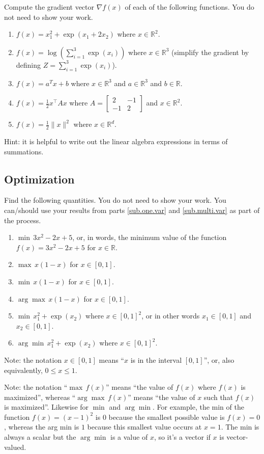 \documentclass{article}
\def\blu#1{{\color{blu}#1}}
\def\norm#1{\|#1\|}
\def\R{\mathbb{R}}
\def\half{\frac 1 2}
\begin{document}
\blu{Compute the gradient vector $\nabla f(x)$ of each of the following functions.} You do not need to show your work.
\begin{enumerate}
\item $f(x) = x_1^2 + \exp(x_1 + 2x_2)$ where $x \in \R^2$.
\item $f(x) = \log\left(\sum_{i=1}^3\exp(x_i)\right)$ where $x \in \R^3$ (simplify the gradient by defining $Z = \sum_{i=1}^3\exp(x_i)$).
\item $f(x) = a^Tx + b$ where $x \in \R^3$ and $a \in \R^3$ and $b \in \R$.
\item $f(x) = \half x^\top A x$ where $A=\left[ \begin{array}{cc}
2 & -1 \\
 -1 & 2 \end{array} \right]$ and $x \in \mathbb{R}^2$.
 \item $f(x) = \frac{1}{2}\norm{x}^2$ where $x \in \R^d$.
\end{enumerate}

Hint: it is helpful to write out the linear algebra expressions in terms of summations.


\subsection{Optimization}
\blu{Find the following quantities.} You do not need to show your work. 
You can/should use your results from parts \ref{sub.one.var} and \ref{sub.multi.var} as part of the process.

\begin{enumerate}
\item $\min \, 3x^2-2x+5$, or, in words, the minimum value of the function $f(x) = 3x^2 -2x + 5$ for $x \in \R$.
\item $\max \, x(1-x)$ for $x\in [0,1]$.
\item $\min \, x(1-x)$ for $x\in [0,1]$.
\item $\arg \max \, x(1-x)$ for $x\in[0,1]$. 
\item $\min \, x_1^2 + \exp(x_2)$ where $x \in [0,1]^2$, or in other words $x_1\in [0,1]$ and $x_2\in [0,1]$.
\item $\arg \min \, x_1^2 + \exp(x_2)$ where $x \in [0,1]^2$. 
\end{enumerate}

Note: the notation $x\in [0,1]$ means ``$x$ is in the interval $[0,1]$'', or, also equivalently, $0 \leq x \leq 1$.

Note: the notation ``$\max \, f(x)$'' means ``the value of $f(x)$ where $f(x)$ is maximized'', whereas ``$\arg \max \, f(x)$'' means ``the value of $x$ such that $f(x)$ is maximized''.
Likewise for $\min$ and $\arg \min$. For example, the min of the function $f(x)=(x-1)^2$ is $0$ because the smallest possible value is $f(x)=0$, 
whereas the arg min is $1$ because this smallest value occurs at $x=1$. The min is always a scalar but the $\arg \min$ is a value of $x$, so it's a vector 
if $x$ is vector-valued.
\end{document}
